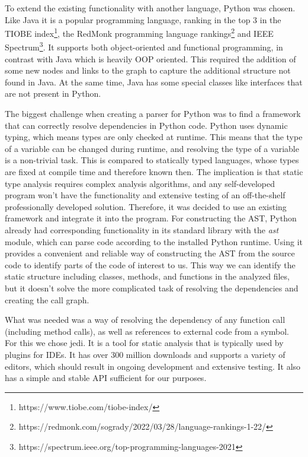 \documentclass[a4paper,11pt,twoside]{article}
\theoremstyle{definition} %
\begin{document}
To extend the existing functionality with another language, Python was chosen. Like Java it is a popular programming language, ranking in the top 3 in the TIOBE index\footnote{https://www.tiobe.com/tiobe-index/}, the RedMonk programming language rankings\footnote{https://redmonk.com/sogrady/2022/03/28/language-rankings-1-22/} and IEEE Spectrum\footnote{https://spectrum.ieee.org/top-programming-languages-2021}. It supports both object-oriented and functional programming, in contrast with Java which is heavily OOP oriented. This required the addition of some new nodes and links to the graph to capture the additional structure not found in Java. At the same time, Java has some special classes like interfaces that are not present in Python. 

The biggest challenge when creating a parser for Python was to find a framework that can correctly resolve dependencies in Python code. Python uses dynamic typing, which means types are only checked at runtime. This means that the type of a variable can be changed during runtime, and resolving the type of a variable is a non-trivial task. This is compared to statically typed languages, whose types are fixed at compile time and therefore known then. The implication is that static type analysis requires complex analysis algorithms, and any self-developed program won’t have the functionality and extensive testing of an off-the-shelf professionally developed solution. Therefore, it was decided to use an existing framework and integrate it into the program. For constructing the AST, Python already had corresponding functionality in its standard library with the \textit{ast} module, which can parse code according to the installed Python runtime. Using it provides a convenient and reliable way of constructing the AST from the source code to identify parts of the code of interest to us. This way we can identify the static structure including classes, methods, and functions in the analyzed files, but it doesn’t solve the more complicated task of resolving the dependencies and creating the call graph. 

What was needed was a way of resolving the dependency of any function call (including method calls), as well as references to external code from a symbol. For this we chose jedi. It is a tool for static analysis that is typically used by plugins for IDEs. It has over 300 million downloads and supports a variety of editors, which should result in ongoing development and extensive testing. It also has a simple and stable API sufficient for our purposes. 
\end{document}

